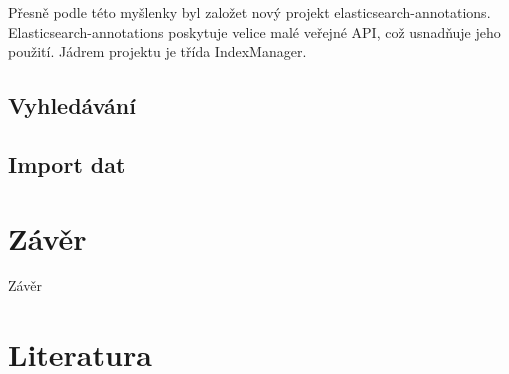 \documentclass[11pt,draft,oneside]{fithesis2}
\begin{document}
Přesně podle této myšlenky byl založet nový projekt elasticsearch-annotations. Elasticsearch-annotations poskytuje velice malé veřejné API, což usnadňuje jeho použití. Jádrem projektu je třída IndexManager.

\section{Vyhledávání}

\section{Import dat}

\chapter{Závěr}
Závěr



\printindex

\begingroup
\def\tmpchapter{0}
\renewcommand{\chaptername}{}
\renewcommand{\thechapter}{}
\chapter{Literatura}
\renewcommand{\chapter}[2]{}%




\endgroup

\appendix

\end{document}
